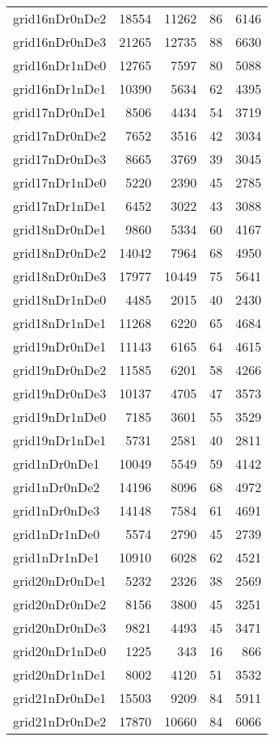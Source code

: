 \begin{longtable}{lrrrr}
grid16nDr0nDe2 & 18554 & 11262 & 86 & 6146 \\
grid16nDr0nDe3 & 21265 & 12735 & 88 & 6630 \\
grid16nDr1nDe0 & 12765 & 7597 & 80 & 5088 \\
grid16nDr1nDe1 & 10390 & 5634 & 62 & 4395 \\
grid17nDr0nDe1 & 8506 & 4434 & 54 & 3719 \\
grid17nDr0nDe2 & 7652 & 3516 & 42 & 3034 \\
grid17nDr0nDe3 & 8665 & 3769 & 39 & 3045 \\
grid17nDr1nDe0 & 5220 & 2390 & 45 & 2785 \\
grid17nDr1nDe1 & 6452 & 3022 & 43 & 3088 \\
grid18nDr0nDe1 & 9860 & 5334 & 60 & 4167 \\
grid18nDr0nDe2 & 14042 & 7964 & 68 & 4950 \\
grid18nDr0nDe3 & 17977 & 10449 & 75 & 5641 \\
grid18nDr1nDe0 & 4485 & 2015 & 40 & 2430 \\
grid18nDr1nDe1 & 11268 & 6220 & 65 & 4684 \\
grid19nDr0nDe1 & 11143 & 6165 & 64 & 4615 \\
grid19nDr0nDe2 & 11585 & 6201 & 58 & 4266 \\
grid19nDr0nDe3 & 10137 & 4705 & 47 & 3573 \\
grid19nDr1nDe0 & 7185 & 3601 & 55 & 3529 \\
grid19nDr1nDe1 & 5731 & 2581 & 40 & 2811 \\
grid1nDr0nDe1 & 10049 & 5549 & 59 & 4142 \\
grid1nDr0nDe2 & 14196 & 8096 & 68 & 4972 \\
grid1nDr0nDe3 & 14148 & 7584 & 61 & 4691 \\
grid1nDr1nDe0 & 5574 & 2790 & 45 & 2739 \\
grid1nDr1nDe1 & 10910 & 6028 & 62 & 4521 \\
grid20nDr0nDe1 & 5232 & 2326 & 38 & 2569 \\
grid20nDr0nDe2 & 8156 & 3800 & 45 & 3251 \\
grid20nDr0nDe3 & 9821 & 4493 & 45 & 3471 \\
grid20nDr1nDe0 & 1225 & 343 & 16 & 866 \\
grid20nDr1nDe1 & 8002 & 4120 & 51 & 3532 \\
grid21nDr0nDe1 & 15503 & 9209 & 84 & 5911 \\
grid21nDr0nDe2 & 17870 & 10660 & 84 & 6066 \\

\end{longtable}
